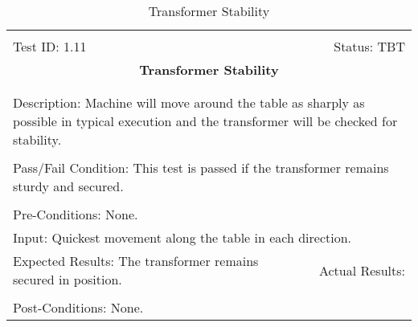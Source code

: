 \documentclass[titlepage]{article}
\begin{document}
\begin{center}%
\begin{table}
\begin{tabular}{|l r|}\hline&\\[-2mm]
	Test ID: 1.11	&Status: TBT\\[-3mm]
	\multicolumn{2}{|c|}{\textbf{\large{Transformer Stability}}}\\&\\\hline&\\[-3mm]
	\multicolumn{2}{|p{\textwidth}|}{Description: Machine will move around the table as sharply as possible in typical execution and the transformer will be checked for stability.}\\[1mm]\hline&\\[-3mm]
	\multicolumn{2}{|p{\textwidth}|}{Pass/Fail Condition: This test is passed if the transformer remains sturdy and secured.}\\[1mm]\hline&\\[-3mm]
	\multicolumn{2}{|p{\textwidth}|}{Pre-Conditions: None.}\\[4mm]
	\multicolumn{2}{|p{\textwidth}|}{Input: Quickest movement along the table in each direction.}\\[2mm]\hline
	\multicolumn{1}{|p{0.49\textwidth}}{Expected Results: The transformer remains secured in position.}	&\multicolumn{1}{|p{0.45\textwidth}|}{Actual Results:}\\\hline&\\[-3mm]
	\multicolumn{2}{|p{\textwidth}|}{Post-Conditions: None.}\\\hline
\end{tabular}
\caption{Transformer Stability}
\end{table}
\end{center}
\end{document}
